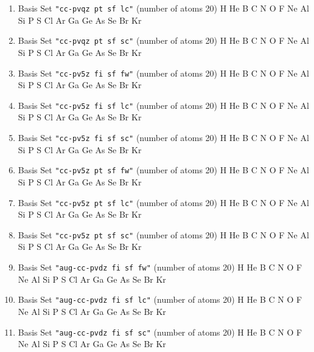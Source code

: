 \begin{enumerate}
\item Basis Set \verb#"cc-pvqz pt sf lc"# (number of atoms 20)  \newline 
  H He B C N O F Ne Al Si P S Cl Ar Ga Ge As Se Br Kr


\item Basis Set \verb#"cc-pvqz pt sf sc"# (number of atoms 20)  \newline 
  H He B C N O F Ne Al Si P S Cl Ar Ga Ge As Se Br Kr


\item Basis Set \verb#"cc-pv5z fi sf fw"# (number of atoms 20)  \newline 
  H He B C N O F Ne Al Si P S Cl Ar Ga Ge As Se Br Kr


\item Basis Set \verb#"cc-pv5z fi sf lc"# (number of atoms 20)  \newline 
  H He B C N O F Ne Al Si P S Cl Ar Ga Ge As Se Br Kr


\item Basis Set \verb#"cc-pv5z fi sf sc"# (number of atoms 20)  \newline 
  H He B C N O F Ne Al Si P S Cl Ar Ga Ge As Se Br Kr


\item Basis Set \verb#"cc-pv5z pt sf fw"# (number of atoms 20)  \newline 
  H He B C N O F Ne Al Si P S Cl Ar Ga Ge As Se Br Kr


\item Basis Set \verb#"cc-pv5z pt sf lc"# (number of atoms 20)  \newline 
  H He B C N O F Ne Al Si P S Cl Ar Ga Ge As Se Br Kr


\item Basis Set \verb#"cc-pv5z pt sf sc"# (number of atoms 20)  \newline 
  H He B C N O F Ne Al Si P S Cl Ar Ga Ge As Se Br Kr


\item Basis Set \verb#"aug-cc-pvdz fi sf fw"# (number of atoms 20)  \newline 
  H He B C N O F Ne Al Si P S Cl Ar Ga Ge As Se Br Kr


\item Basis Set \verb#"aug-cc-pvdz fi sf lc"# (number of atoms 20)  \newline 
  H He B C N O F Ne Al Si P S Cl Ar Ga Ge As Se Br Kr


\item Basis Set \verb#"aug-cc-pvdz fi sf sc"# (number of atoms 20)  \newline 
  H He B C N O F Ne Al Si P S Cl Ar Ga Ge As Se Br Kr



\end{enumerate}
